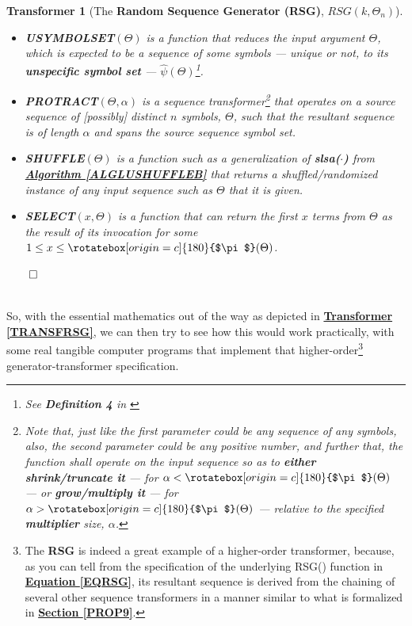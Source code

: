 \documentclass[a4paper, 18pt]{book} %
\newtheorem{transf}{Transformer}
\newcommand{\invpi}{\rotatebox[origin=c]{180}{$\pi$}}
\begin{document}
{\begin{minipage}{0.9\textwidth}
\begin{transf}[The \textbf{Random Sequence Generator (RSG)}, $RSG(k,\Theta_n)$]
\begin{itemize}
{}
\item \textbf{USYMBOLSET}$(\Theta)$ is a function that reduces the input argument $\Theta$, which is expected to be a sequence of some symbols --- unique or not, to its \textbf{unspecific symbol set} --- $\hat{\psi}(\Theta)$\footnote{See \textbf{Definition 4} in \cite{ossipaper}}.
\item \textbf{PROTRACT}$(\Theta, \alpha)$ is a sequence transformer\footnote{Note that, just like the first parameter could be any sequence of any symbols, also, the second parameter could be any positive number, and further that, the function shall operate on the input sequence so as to \textbf{either shrink/truncate it} --- for $\alpha < \invpi(\Theta)$ --- or \textbf{grow/multiply it} --- for $\alpha > \invpi(\Theta)$ --- relative to the specified \textbf{multiplier} size, $\alpha$.} that operates on a source sequence of [possibly] distinct $n$ symbols, $\Theta$, such that the resultant sequence is of length $\alpha$ and spans the source sequence symbol set.
\item  \textbf{SHUFFLE}$(\Theta)$ is a function such as a generalization of \textbf{slsa($\cdot$)} from \textbf{\hyperref[ALGLUSHUFFLEB]{Algorithm \ref{ALGLUSHUFFLEB}}} that returns a shuffled/randomized instance of any input sequence such as $\Theta$ that it is given.
\item \textbf{SELECT}$(x, \Theta)$ is a function that can return the first $x$ terms from $\Theta$ as the result of its invocation for some $1 \leq x \leq \invpi(\Theta)$.
\end{itemize}
$\qed$
\end{transf}
\end{minipage}}
\\

So, with the essential mathematics out of the way as depicted in \textbf{\hyperref[TRANSFRSG]{Transformer \ref{TRANSFRSG}}}, we can then try to see how this would work practically, with some real tangible computer programs that implement that higher-order\footnote{The \textbf{RSG} is indeed a great example of a higher-order transformer, because, as you can tell from the specification of the underlying RSG() function in \textbf{\hyperref[EQRSG]{Equation \ref{EQRSG}}}, its resultant sequence is derived from the chaining of several other sequence transformers in a manner similar to what is formalized in \textbf{\hyperref[PROP9]{Section \ref{PROP9}}}.} generator-transformer specification.
\end{document}
